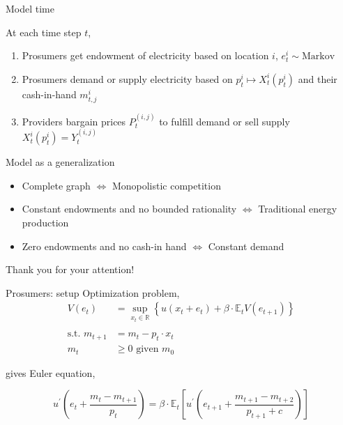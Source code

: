\documentclass[xcolor={svgnames}]{beamer}
\newcommand{\E}{\mathbb{E}}
\newcommand{\R}{\mathbb{R}}
\begin{document}
\begin{frame} {Model time}
    \begin{minipage}{0.45\textwidth}
        \resizebox{\textwidth}{!}{}
    \end{minipage}
    \hfill
    \begin{minipage}{0.5\textwidth}
        At each time step $t$,
        \vspace{1em}
        \begin{enumerate} \setlength{\itemsep}{1em}
            \item Prosumers get endowment of electricity based on location $i$, $e^i_t \sim \text{Markov}$
            \item Prosumers demand or supply electricity based on $p^i_t \mapsto X^i_t(p^i_t)$ and their cash-in-hand $m^i_{t, j}$
            \item Providers bargain prices $P_t^{(i, j)}$ to fulfill demand or sell supply $ X^i_t(p^i_t) = Y_t^{(i, j)}$
        \end{enumerate}
    \end{minipage}
\end{frame}

\begin{frame}{Model as a generalization}
    \begin{itemize}\setlength{\itemsep}{1em}
        \item Complete graph $\iff$ Monopolistic competition
        \item Constant endowments and no bounded rationality $\iff$ Traditional energy production
        \item Zero endowments and no cash-in hand $\iff$ Constant demand
    \end{itemize}
\end{frame}

\begin{frame}
    \huge{Thank you for your attention!}
\end{frame}

\iffalse
    \begin{frame}{Prosumers: setup}
        Optimization problem,
        \begin{equation*}
            \begin{split}
                V(e_t) &= \sup_{x_t \in \R} \left\{u(x_t + e_t) + \beta \cdot \E_t V( e_{t+1} ) \right\} \\
                \\
                \text{s.t. } m_{t+1} &= m_{t} - p_{t} \cdot x_{t}\\
                m_t  &\geq 0 \text{ given } m_0
            \end{split}
        \end{equation*}

        gives Euler equation,

        \begin{equation*}
            u^\prime\left( e_t + \frac{m_t - m_{t+1}}{p_t} \right) = \beta \cdot \E_t \left[ u^\prime\left(e_{t+1} + \frac{m_{t+1} - m_{t+2}}{ p_{t+1} + c} \right)  \right]
        \end{equation*}
    \end{frame}
\end{document}
